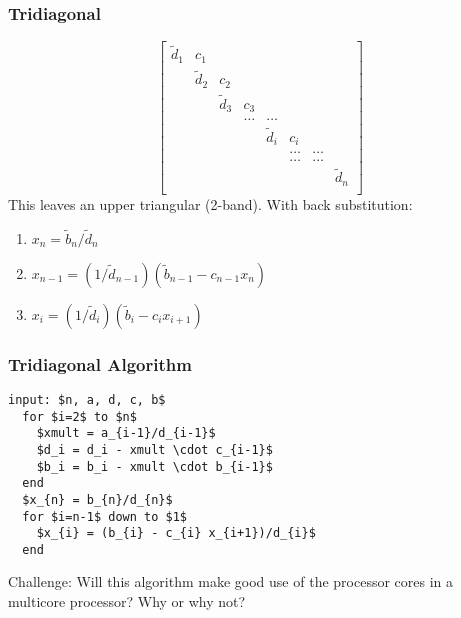 \documentclass[10pt]{beamer}
\begin{document}
\begin{frame}
\frametitle{Tridiagonal}
\begin{equation*}
  \begin{bmatrix}
{\tilde{d}}_1 & c_1 &       &         &       &       &          &    \\
 & {\tilde{d}}_2 & c_2   &         &       &       &          &    \\
    & & {\tilde{d}}_3   & c_3     &       &       &          &    \\
    &     &  & \dots   & \dots &       &          &    \\
    &     &       &  & {\tilde{d}}_i   & c_{i} &          &    \\
    &     &       &         & & \dots & \dots    &    \\
    &     &       &         & & \dots & \dots    &    \\
    &     &       &         &       &       & & {\tilde{d}}_n   \\
  \end{bmatrix}
\end{equation*}
This leaves an upper triangular (2-band).  With back substitution:
\begin{enumerate}
  \item $x_n = {\tilde{b}}_n/{\tilde{d}}_n$
  \item $x_{n-1} = (1/{\tilde{d}}_{n-1})({\tilde{b}}_{n-1} - c_{n-1}x_n)$
  \item $x_{i} = (1/{\tilde{d}}_{i})({\tilde{b}}_{i} - c_{i}x_{i+1})$
\end{enumerate}
\end{frame}
\begin{frame}[fragile]
\frametitle{Tridiagonal Algorithm}
\begin{lstlisting}[mathescape]
  input: $n, a, d, c, b$
  for $i=2$ to $n$
    $xmult = a_{i-1}/d_{i-1}$
    $d_i = d_i - xmult \cdot c_{i-1}$
    $b_i = b_i - xmult \cdot b_{i-1}$
  end
  $x_{n} = b_{n}/d_{n}$
  for $i=n-1$ down to $1$
    $x_{i} = (b_{i} - c_{i} x_{i+1})/d_{i}$
  end
\end{lstlisting}
\begin{alertblock}{}
Challenge: Will this algorithm make good use of the processor cores in
a multicore processor?  Why or why not? 
\end{alertblock}
\end{frame}
\end{document}
